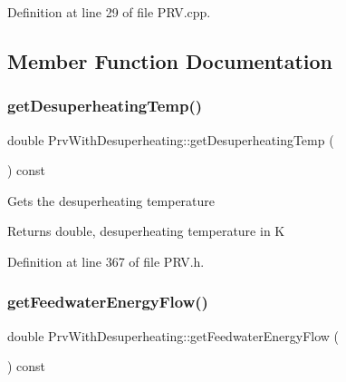 Definition at line 29 of file P\+R\+V.\+cpp.



\subsection{Member Function Documentation}
\mbox{\label{class_prv_with_desuperheating_af334a9ff9a14d110cb2851a76d5d84fb}} 
\subsubsection{\texorpdfstring{get\+Desuperheating\+Temp()}{getDesuperheatingTemp()}}
{\footnotesize\ttfamily double Prv\+With\+Desuperheating\+::get\+Desuperheating\+Temp (\begin{DoxyParamCaption}{ }\end{DoxyParamCaption}) const\hspace{0.3cm}{\ttfamily [inline]}}

Gets the desuperheating temperature

\begin{DoxyReturn}{Returns}
double, desuperheating temperature in K 
\end{DoxyReturn}


Definition at line 367 of file P\+R\+V.\+h.

\mbox{\label{class_prv_with_desuperheating_a42945a77fcdbaf1e1844c444c696f8b0}} 
\subsubsection{\texorpdfstring{get\+Feedwater\+Energy\+Flow()}{getFeedwaterEnergyFlow()}}
{\footnotesize\ttfamily double Prv\+With\+Desuperheating\+::get\+Feedwater\+Energy\+Flow (\begin{DoxyParamCaption}{ }\end{DoxyParamCaption}) const\hspace{0.3cm}{\ttfamily [inline]}}

